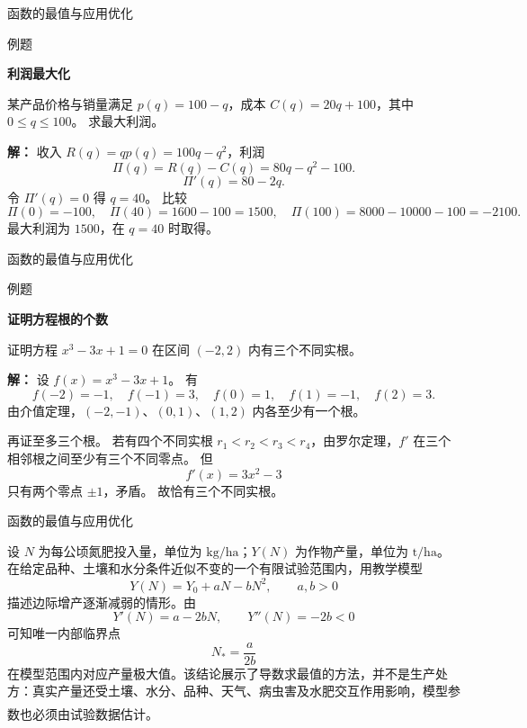 \documentclass[aspectratio=169,10pt,fontset=fandol]{ctexbeamer}
\newcommand{\upcite}[1]{\textsuperscript{\textsuperscript{\cite{#1}}}}
\begin{document}
\begin{frame}[t,fragile]{函数的最值与应用优化}
\normalsize
\begin{block}{例题}
{\normalsize
\textbf{利润最大化}\par

某产品价格与销量满足 $p(q)=100-q$，成本 $C(q)=20q+100$，其中 $0\leq q\leq100$。 求最大利润。

}
\end{block}
\pause
{\normalsize
\textbf{解：}
收入 $R(q)=qp(q)=100q-q^2$，利润
\[
\Pi(q)=R(q)-C(q)=80q-q^2-100.
\]
\[
\Pi'(q)=80-2q.
\]
令 $\Pi'(q)=0$ 得 $q=40$。 比较
\[
\Pi(0)=-100,\quad \Pi(40)=1600-100=1500,\quad \Pi(100)=8000-10000-100=-2100.
\]
最大利润为 $1500$，在 $q=40$ 时取得。

}
\end{frame}
\begin{frame}[t,fragile]{函数的最值与应用优化}
\normalsize
\begin{block}{例题}
{\normalsize
\textbf{证明方程根的个数}\par

证明方程 $x^3-3x+1=0$ 在区间 $(-2,2)$ 内有三个不同实根。

}
\end{block}
\pause
{\normalsize
\textbf{解：}
设 $f(x)=x^3-3x+1$。 有
\[
f(-2)=-1,\quad f(-1)=3,\quad f(0)=1,\quad f(1)=-1,\quad f(2)=3.
\]
由介值定理，$(-2,-1)$、$(0,1)$、$(1,2)$ 内各至少有一个根。

再证至多三个根。 若有四个不同实根 $r_1<r_2<r_3<r_4$，由罗尔定理，$f'$ 在三个相邻根之间至少有三个不同零点。 但
\[
f'(x)=3x^2-3
\]
只有两个零点 $\pm1$，矛盾。 故恰有三个不同实根。

}
\end{frame}
\begin{frame}[t,fragile]{函数的最值与应用优化}
\normalsize
{\normalsize
\begin{application}[农业：简化的最佳施肥量模型]
设 $N$ 为每公顷氮肥投入量，单位为 $\mathrm{kg/ha}$；$Y(N)$ 为作物产量，单位为 $\mathrm{t/ha}$。在给定品种、土壤和水分条件近似不变的一个有限试验范围内，用教学模型
\[
Y(N)=Y_0+aN-bN^2,\qquad a,b>0
\]
描述边际增产逐渐减弱的情形。由
\[
Y'(N)=a-2bN,\qquad Y''(N)=-2b<0
\]
可知唯一内部临界点
\[
N_*=\frac{a}{2b}
\]
在模型范围内对应产量极大值。该结论展示了导数求最值的方法，并不是生产处方：真实产量还受土壤、水分、品种、天气、病虫害及水肥交互作用影响，模型参数也必须由试验数据估计。\upcite{TaizPlant}
\end{application}
}
\end{frame}
\end{document}
